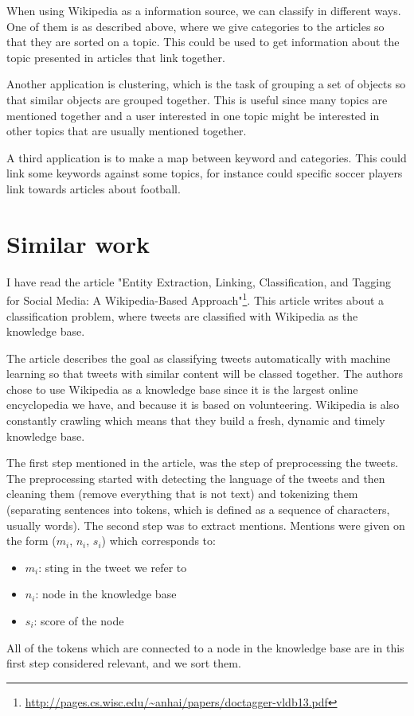 \documentclass[11pt,english,a4paper]{article}
\begin{document}
When using Wikipedia as a information source, we can classify in different ways. One of them is as described above, where we give categories to the articles so that they are sorted on a topic. This could be used to get information about the topic presented in articles that link together. 

Another application is clustering, which is the task of grouping a set of objects so that similar objects are grouped together. This is useful since many topics are mentioned together and a user interested in one topic might be interested in other topics that are usually mentioned together. 

A third application is to make a map between keyword and categories. This could link some keywords against some topics, for instance could specific soccer players link towards articles about football. 


\section*{Similar work}
I have read the article "Entity Extraction, Linking, Classification, and Tagging for Social Media: A Wikipedia-Based Approach"\footnote{\url{http://pages.cs.wisc.edu/~anhai/papers/doctagger-vldb13.pdf}}. This article writes about a classification problem, where tweets are classified with Wikipedia as the knowledge base. 

The article describes the goal as classifying tweets automatically with machine learning so that tweets with similar content will be classed together. %
The authors chose to use Wikipedia as a knowledge base since it is the largest online encyclopedia we have, and because it is based on volunteering. Wikipedia is also constantly crawling which means that they build a fresh, dynamic and timely knowledge base.  

The first step mentioned in the article, was the step of preprocessing the tweets. The preprocessing started with detecting the language of the tweets and then cleaning them (remove everything that is not text) and tokenizing them (separating sentences into tokens, which is defined as a sequence of characters, usually words). The second step was to extract mentions. Mentions were given on the form ($m_{i}$, $n_{i}$, $s_{i}$) which corresponds to: 
\begin{itemize}
\item $m_{i}$: sting in the tweet we refer to
\item $n_{i}$: node in the knowledge base
\item $s_{i}$: score of the node 
\end{itemize}
All of the tokens which are connected to a node in the knowledge base are in this first step considered relevant, and we sort them. 
\end{document}
